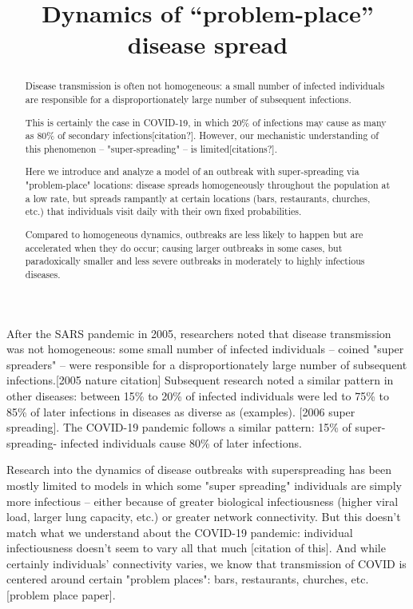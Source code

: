 \documentclass{article}
\title{Dynamics of ``problem-place'' disease spread}
\author{}
\date{}
\begin{document}
\maketitle

\begin{abstract}
Disease transmission is often not homogeneous: a small
number of infected individuals are responsible for a disproportionately
large number of subsequent infections. 

This is certainly the case in COVID-19, in which 20\% of infections may cause
as many as 80\% of secondary infections[citation?].
However, our mechanistic understanding of this phenomenon – "super-spreading" –
is limited[citations?].

Here we introduce and analyze
a model of an outbreak with super-spreading via "problem-place" locations:
disease spreads homogeneously throughout the population at a low rate, but
spreads rampantly at certain locations (bars, restaurants, churches, etc.)
that individuals visit daily with their own fixed probabilities.

Compared to homogeneous dynamics, outbreaks are less
likely to happen but are accelerated when they do occur; causing larger
outbreaks in some cases, but paradoxically smaller and less severe outbreaks 
in moderately to highly infectious diseases.
\end{abstract}


After the SARS pandemic in 2005, researchers noted that disease transmission
was not homogeneous: some small number of infected individuals – coined
"super spreaders" – were responsible
for a disproportionately large number of subsequent infections.[2005 nature citation]
Subsequent research noted a similar pattern in other diseases: between
15\% to 20\% of infected individuals were led to 75\% to 85\% of later infections
in diseases as diverse as (examples). [2006 super spreading]. 
The COVID-19 pandemic follows a similar pattern: 15\% of super-spreading-
infected individuals cause 80\% of later infections.

Research into the dynamics of disease outbreaks with superspreading has
been mostly limited to models in which some "super spreading" individuals
are simply more infectious – either because of greater biological infectiousness
(higher viral load, larger lung capacity, etc.) or greater network connectivity.
But this doesn't match what we understand about the COVID-19 pandemic: 
individual infectiousness doesn't seem to vary all that much [citation of this].
And while certainly individuals'
connectivity varies, we know that transmission of COVID is centered around
certain "problem places": bars, restaurants, churches, etc. [problem place paper].
\end{document}
